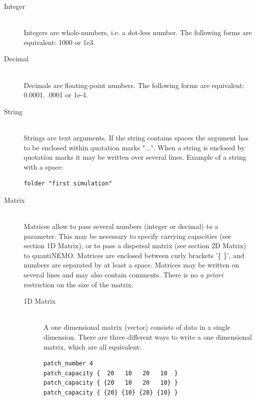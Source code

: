 \documentclass[letterpaper,12pt,oneside]{book}
\begin{document}
\begin{description}
\item[Integer]\hspace*{\fill}\\
Integers are whole-numbers, i.e. a dot-less number. The following forms are equivalent: 1000 or 1e3.

\item[Decimal]\hspace*{\fill}\\
Decimals are floating-point numbers. The following forms are equivalent: 0.0001, .0001 or 1e-4.

\item[String]\hspace*{\fill}\\
Strings are text arguments. If the string contains spaces the argument has to be enclosed within quotation marks "...". When a string is enclosed by quotation marks it may be written over several lines. Example of a string with a space:
\begin{lstlisting}[frame=single]
folder "first simulation"
\end{lstlisting}

\item[\label{matparam}Matrix]\hspace*{\fill}\\
Matrices allow to pass several numbers (integer or decimal) to a parameter. This may be necessary to specify carrying capacities (see section 1D Matrix), or to pass a dispersal matrix (see section 2D Matrix) to quantiNEMO. Matrices are enclosed between curly brackets '\{ \}', and numbers are separated by at least a space. Matrices may be written on several lines and may also contain comments. There is no \textit{a priori} restriction on the size of the matrix. 

\begin{description}
\item[1D Matrix]\hspace*{\fill}\\
A one dimensional matrix (vector) consists of data in a single dimension. There are three different ways to write a one dimensional matrix, which are all equivalent:
\begin{lstlisting}[frame=single]
patch_number 4
patch_capacity {  20   10   20   10  }
patch_capacity { {20   10   20   10} }
patch_capacity { {20} {10} {20} {10} }
\end{lstlisting}


\end{description}
\end{description}
\end{document}
